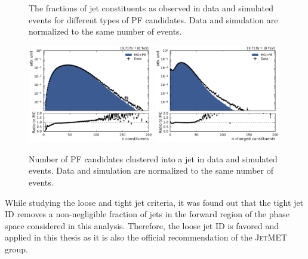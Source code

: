 \begin{figure}[htbp]
    \caption[PF candidate fractions in jets]{The fractions of jet constituents as
            observed in data and simulated events for different types of PF candidates.
            Data and simulation are normalized to the same number of events.}
    \label{fig:jet_constituents_fractions}
\end{figure}

\begin{figure}[htbp]
    \centering
    \includegraphics[width=0.49\textwidth]{figures/measurement/jet_constituent_nConstituents.pdf}\hfill
    \includegraphics[width=0.49\textwidth]{figures/measurement/jet_constituent_nCharged.pdf}
    \caption[Number of particle candidates in jets.]{Number of PF candidates
             clustered into a jet in data and simulated events. Data and simulation are
             normalized to the same number of events.}
    \label{fig:jet_constituents_counts}
\end{figure}

While studying the loose and tight jet criteria, it was found out that the tight jet
ID removes a non-negligible fraction of jets in the forward region of the
phase space considered in this analysis. Therefore, the loose jet ID is favored
and applied in this thesis as it is also the official recommendation of the
\textsc{JetMET} group.


